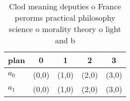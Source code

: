 \documentclass[a4paper]{article}
\begin{document}
\begin{table}
\begin{adjustbox}{width=0.5\columnwidth}
\begin{tabular}{|l|l|l|l|l|}
\hline
\textbf{plan} & \multicolumn{1}{c|}{\textbf{0}} & \multicolumn{1}{c|}{\textbf{1}} & \multicolumn{1}{c|}{\textbf{2}} & \multicolumn{1}{c|}{\textbf{3}} \\ \hline
\textbf{$a_0$}  & (0,0) & (1,0) & (2,0) & (3,0) \\ \hline
\textbf{$a_1$}  & (0,0) & (1,0) & (2,0) & (3,0) \\ \hline
\end{tabular}
\end{adjustbox}
\caption{Clod meaning deputies o France perorms practical philosophy science o morality theory o light and b
}
\end{table}
\end{document}
